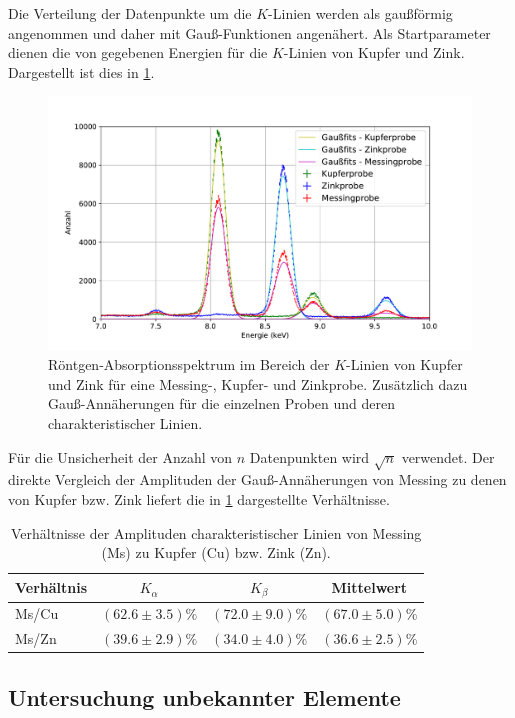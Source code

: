 	Die Verteilung der Datenpunkte um die $K$-Linien werden als gaußförmig angenommen und daher mit Gauß-Funktionen angenähert.
	Als Startparameter dienen die von \cite{brukerPTE} gegebenen Energien für die $K$-Linien von Kupfer und Zink.
	Dargestellt ist dies in \cref{fig:k-linien}.
	\begin{figure}[ht]
		\centering
		\includegraphics[width=.8\textwidth]{plots/KupferprobeK}
		\caption{Röntgen-Absorptionsspektrum im Bereich der $K$-Linien von Kupfer und Zink für eine Messing-, Kupfer- und Zinkprobe. Zusätzlich dazu Gauß-Annäherungen für die einzelnen Proben und deren charakteristischer Linien.}
		\label{fig:k-linien}
	\end{figure}
	Für die Unsicherheit der Anzahl von $n$ Datenpunkten wird $\sqrt{n}$ verwendet.
	Der direkte Vergleich der Amplituden der Gauß-Annäherungen von Messing zu denen von Kupfer bzw. Zink liefert die in \cref{tab:amplituden} dargestellte Verhältnisse.
	\begin{table}
		\centering
		\caption{Verhältnisse der Amplituden charakteristischer Linien von Messing (Ms) zu Kupfer (Cu) bzw. Zink (Zn).}
		\begin{tabular}{l|c|c|c}
			Verhältnis & $K_\alpha$ & $K_\beta$ & Mittelwert \\ \hline
			Ms/Cu & $(62.6\pm3.5)\%$ & $(72.0\pm9.0)\%$ & $(67.0\pm5.0)\%$ \\
			Ms/Zn & $(39.6\pm2.9)\%$ & $(34.0\pm4.0)\%$ & $(36.6\pm2.5)\%$ \\
		\end{tabular}
		\label{tab:amplituden}
	\end{table}

\subsection{Untersuchung unbekannter Elemente} %

